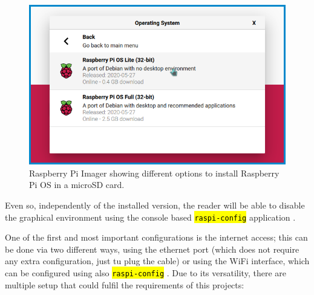 \documentclass[11pt,a4paper,dvipsnames,twoside]{article}
\newcommand{\cmd}[1] {\hl{\texttt{#1}}}
\begin{document}
\begin{figure}[htp]
  \centering
  \includegraphics[width=.7\textwidth]{../pictures/rpi_imager.png}
  \caption{Raspberry Pi Imager showing different options to install Raspberry Pi OS in a microSD card.}
  \label{fig:RpiImager}
\end{figure}

Even so, independently of the installed version, the reader will be able to disable the graphical environment using the console based \cmd{raspi-config} application \cite{RaspiConf}. 

One of the first and most important configurations is the internet access; this can be done via two different ways, using the ethernet port (which does not require any extra configuration, just tu plug the cable) or using the WiFi interface, which can be configured using also \cmd{raspi-config} \cite{RaspiWIFIcli}. Due to its versatility, there are multiple setup that could fulfil the requirements of this projects:
\end{document}
